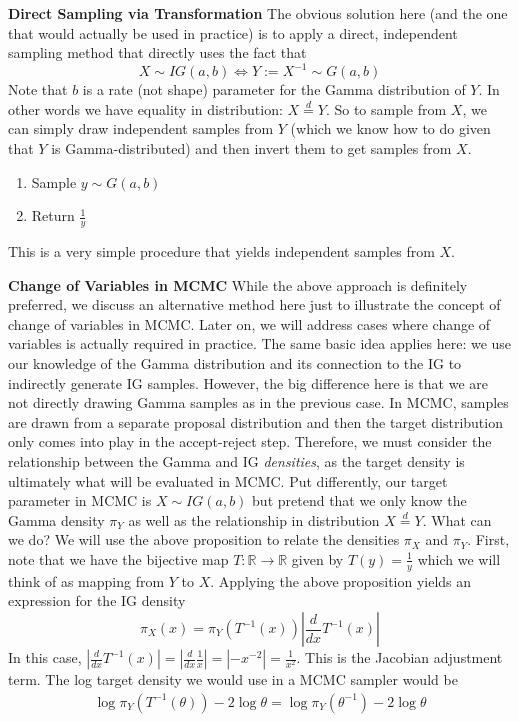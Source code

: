 \documentclass[12pt]{article}
\newcommand*{\abs}[1]{\left\lvert#1\right\rvert}
\newcommand{\R}{\mathcal{R}}
\def\R{\mathbb{R}}
\begin{document}
\noindent
\textbf{Direct Sampling via Transformation}
The obvious solution here (and the one that would actually be used in practice) is to apply a direct, independent sampling method that directly uses the fact that 
\[X \sim IG(a, b) \iff Y := X^{-1} \sim G(a, b) \]
Note that $b$ is a rate (not shape)  parameter for the Gamma distribution of $Y$. In other words we have equality in distribution: $X \overset{d}{=} Y$. So to sample 
from $X$, we can simply draw independent samples from $Y$ (which we know how to do given that $Y$ is Gamma-distributed) and then invert them to get 
samples from $X$. 
\begin{enumerate}
\item Sample $y \sim G(a, b)$
\item Return $\frac{1}{y}$
\end{enumerate} 
This is a very simple procedure that yields independent samples from $X$. 

\bigskip
\noindent
\textbf{Change of Variables in MCMC}
While the above approach is definitely preferred, we discuss an alternative method here just to illustrate the concept of change of variables in MCMC. Later on, we will address 
cases where change of variables is actually required in practice. The same basic idea applies here: we use our knowledge of the Gamma distribution and its connection to the IG
 to indirectly generate IG samples. However, the big difference here is that we are not directly drawing Gamma samples as in the previous case. In MCMC, samples are drawn from a 
 separate proposal distribution and then the target distribution only comes into play in the accept-reject step. Therefore, we must consider the relationship between the Gamma and IG
 \textit{densities}, as the target density is ultimately what will be evaluated in MCMC. Put differently, our target parameter in MCMC is $X \sim IG(a, b)$ but pretend that we only know 
 the Gamma density $\pi_Y$ as well as the relationship in distribution $X \overset{d}{=} Y$. What can we do? We will use the above proposition to relate the densities $\pi_X$ and $\pi_Y$. 
 First, note that we have the bijective map $T: \R \to \R$ given by $T(y) = \frac{1}{y}$ which we will think of as mapping from $Y$ to $X$. Applying the above proposition yields an expression for 
 the IG density
 \[\pi_X(x) = \pi_Y(T^{-1}(x))\abs{\frac{d}{dx} T^{-1}(x)}\]
 In this case, $\abs{\frac{d}{dx} T^{-1}(x)} = \abs{\frac{d}{dx} \frac{1}{x}} = \abs{-x^{-2}} = \frac{1}{x^2}$. This is the Jacobian adjustment term. The log target density we would use in a MCMC sampler
 would be 
\begin{align*}
\log \pi_Y(T^{-1}(\theta)) - 2\log \theta = \log \pi_Y(\theta^{-1}) - 2\log \theta
\end{align*}
\end{document}
